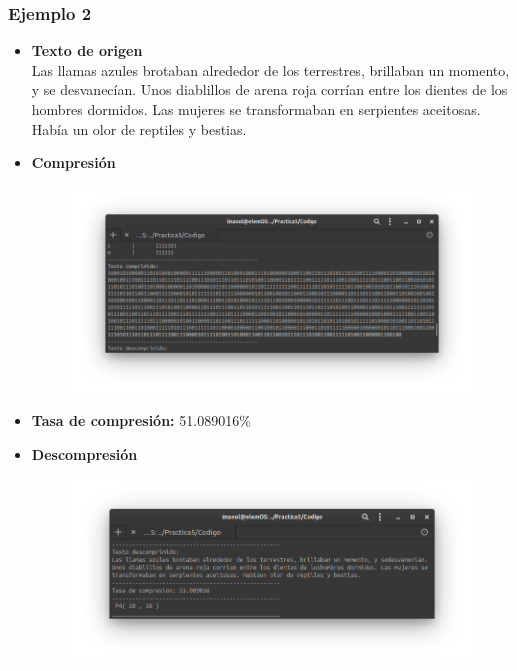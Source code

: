     \subsubsection{Ejemplo 2}
        \begin{itemize}
            \item \textbf{Texto de origen} \\
            Las llamas azules brotaban alrededor de los terrestres, brillaban un momento, y se
desvanecían. Unos diablillos de arena roja corrían entre los dientes de los
hombres dormidos. Las mujeres se transformaban en serpientes aceitosas. Había
un olor de reptiles y bestias. 
            \item \textbf{Compresión} \\
                \begin{figure}[h!]
                    \centering
                    \includegraphics[width=17cm]{Huffman/ejemplos/ejemplo2/ej2-comp.png}
                \end{figure}
                \newpage
            \item \textbf{Tasa de compresión:} 51.089016\% \\
            \item \textbf{Descompresión} \\
                \begin{figure}[h!]
                    \centering
                    \includegraphics[width=17cm]{Huffman/ejemplos/ejemplo2/ej2-decode.png}

\end{figure}
\end{itemize}
